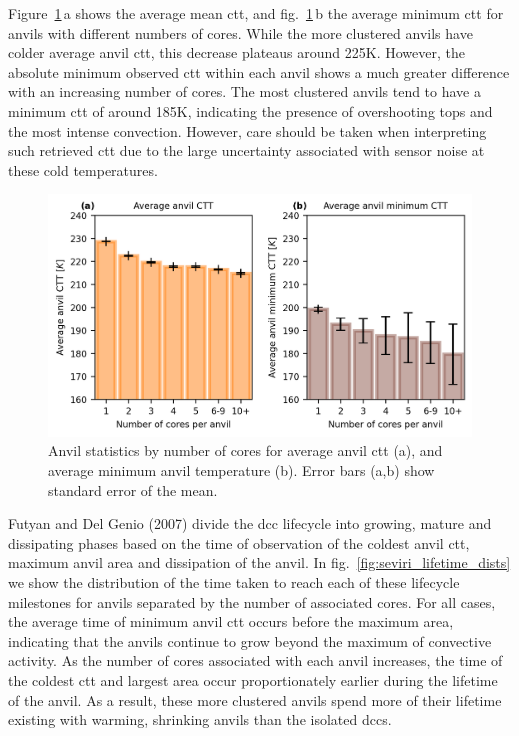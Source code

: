 Figure~\ref{fig:seviri_anvil_ctt_stats}\,a shows the average mean \acrshort{ctt}, and fig.~\ref{fig:seviri_anvil_ctt_stats}\,b the average minimum \acrshort{ctt} for anvils with different numbers of cores.
While the more clustered anvils have colder average anvil \acrshort{ctt}, this
decrease plateaus around 225K. However, the absolute minimum observed
\acrshort{ctt} within each anvil shows a much greater difference with an increasing
number of cores. The most clustered anvils tend to have a minimum \acrshort{ctt} of
around 185K, indicating the presence of overshooting tops and the most
intense convection. However, care should be taken when interpreting such
retrieved \acrshort{ctt} due to the large uncertainty associated with sensor noise
at these cold temperatures.


\begin{figure}[tp]
    \includegraphics[width=\textwidth]{figures/ch3_07.png}
    \caption[
    Anvil statistics by number of cores for average anvil \acrshort{ctt} and average minimum anvil temperature
    ]{
    Anvil statistics by number of cores for average anvil \acrshort{ctt} (a), and average minimum anvil temperature (b). Error bars (a,b) show standard error of the mean.
    }
    \label{fig:seviri_anvil_ctt_stats}
\end{figure}


Futyan and Del Genio (2007) divide the \acrshort{dcc} lifecycle into growing,
mature and dissipating phases based on the time of observation of the
coldest anvil \acrshort{ctt}, maximum anvil area and dissipation of the anvil. In
fig.~\ref{fig:seviri_lifetime_dists} we show the distribution of the time taken to reach each of these
lifecycle milestones for anvils separated by the number of associated
cores. For all cases, the average time of minimum anvil \acrshort{ctt} occurs
before the maximum area, indicating that the anvils continue to grow
beyond the maximum of convective activity. As the number of cores
associated with each anvil increases, the time of the coldest \acrshort{ctt} and
largest area occur proportionately earlier during the lifetime of the
anvil. As a result, these more clustered anvils spend more of their
lifetime existing with warming, shrinking anvils than the isolated \acrshort{dcc}s.


